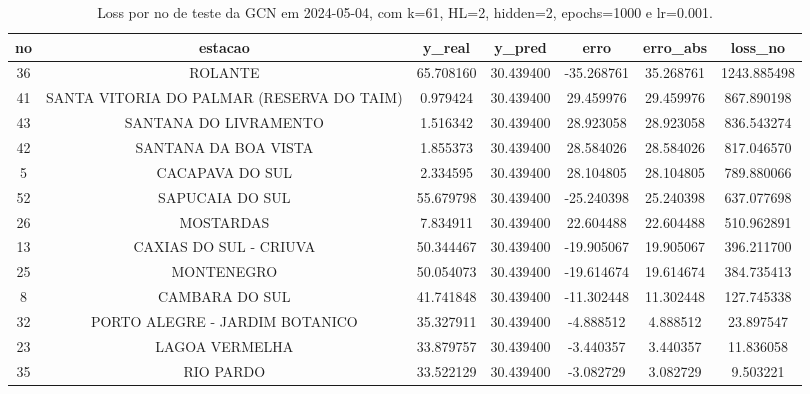 \begin{table}[h]
\centering
\caption{Loss por no de teste da GCN em 2024-05-04, com k=61, HL=2, hidden=2, epochs=1000 e lr=0.001.}
\label{tab:gcn_loss_k61_hl2_h2_e1000_d20240504}
\begin{tabular}{ccccccc}
\toprule
no & estacao & y\_real & y\_pred & erro & erro\_abs & loss\_no \\
\midrule
36 & ROLANTE & 65.708160 & 30.439400 & -35.268761 & 35.268761 & 1243.885498 \\
41 & SANTA VITORIA DO PALMAR (RESERVA DO TAIM) & 0.979424 & 30.439400 & 29.459976 & 29.459976 & 867.890198 \\
43 & SANTANA DO LIVRAMENTO & 1.516342 & 30.439400 & 28.923058 & 28.923058 & 836.543274 \\
42 & SANTANA DA BOA VISTA & 1.855373 & 30.439400 & 28.584026 & 28.584026 & 817.046570 \\
5 & CACAPAVA DO SUL & 2.334595 & 30.439400 & 28.104805 & 28.104805 & 789.880066 \\
52 & SAPUCAIA DO SUL & 55.679798 & 30.439400 & -25.240398 & 25.240398 & 637.077698 \\
26 & MOSTARDAS & 7.834911 & 30.439400 & 22.604488 & 22.604488 & 510.962891 \\
13 & CAXIAS DO SUL - CRIUVA & 50.344467 & 30.439400 & -19.905067 & 19.905067 & 396.211700 \\
25 & MONTENEGRO & 50.054073 & 30.439400 & -19.614674 & 19.614674 & 384.735413 \\
8 & CAMBARA DO SUL & 41.741848 & 30.439400 & -11.302448 & 11.302448 & 127.745338 \\
32 & PORTO ALEGRE - JARDIM BOTANICO & 35.327911 & 30.439400 & -4.888512 & 4.888512 & 23.897547 \\
23 & LAGOA VERMELHA & 33.879757 & 30.439400 & -3.440357 & 3.440357 & 11.836058 \\
35 & RIO PARDO & 33.522129 & 30.439400 & -3.082729 & 3.082729 & 9.503221 \\
\bottomrule
\end{tabular}
\end{table}
